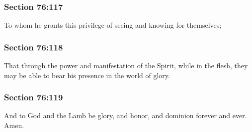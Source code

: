 	\subsubsection{Section 76:117} %
		\label{DC76-117}

		To whom he grants this privilege of seeing and knowing for themselves;


	\subsubsection{Section 76:118} %
		\label{DC76-118}

		That through the power and manifestation of the Spirit, while in the flesh, they may be able to bear his presence in the world of glory.


	\subsubsection{Section 76:119} %
		\label{DC76-119}

		And to God and the Lamb be glory, and honor, and dominion forever and ever. Amen.

